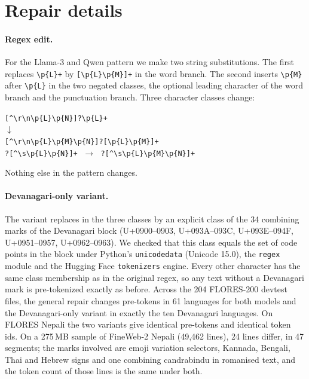 \section{Repair details}
\label{app:regex}

\paragraph{Regex edit.} For the Llama-3 and Qwen pattern we make two string substitutions. The first replaces \texttt{\textbackslash p\{L\}+} by \texttt{[\textbackslash p\{L\}\textbackslash p\{M\}]+} in the word branch. The second inserts \texttt{\textbackslash p\{M\}} after \texttt{\textbackslash p\{L\}} in the two negated classes, the optional leading character of the word branch and the punctuation branch. Three character classes change:
\begin{center}\small
\texttt{[\textasciicircum\textbackslash r\textbackslash n\textbackslash p\{L\}\textbackslash p\{N\}]?\textbackslash p\{L\}+}\\
$\downarrow$\\
\texttt{[\textasciicircum\textbackslash r\textbackslash n\textbackslash p\{L\}\textbackslash p\{M\}\textbackslash p\{N\}]?[\textbackslash p\{L\}\textbackslash p\{M\}]+}\\[4pt]
\texttt{\textvisiblespace?[\textasciicircum\textbackslash s\textbackslash p\{L\}\textbackslash p\{N\}]+}
$\;\rightarrow\;$
\texttt{\textvisiblespace?[\textasciicircum\textbackslash s\textbackslash p\{L\}\textbackslash p\{M\}\textbackslash p\{N\}]+}
\end{center}
Nothing else in the pattern changes.

\paragraph{Devanagari-only variant.} The variant replaces \pM{} in the three classes by an explicit class of the 34 combining marks of the Devanagari block (U+0900--0903, U+093A--093C, U+093E--094F, U+0951--0957, U+0962--0963). We checked that this class equals the set of \pM{} code points in the block under Python's \texttt{unicodedata} (Unicode 15.0), the \texttt{regex} module and the Hugging Face \texttt{tokenizers} engine. Every other character has the same class membership as in the original regex, so any text without a Devanagari mark is pre-tokenized exactly as before. Across the 204 FLORES-200 devtest files, the general repair changes pre-tokens in 61 languages for both models and the Devanagari-only variant in exactly the ten Devanagari languages. On FLORES Nepali the two variants give identical pre-tokens and identical \RII{} token ids. On a 275\,MB sample of FineWeb-2 Nepali (49{,}462 lines), 24 lines differ, in 47 segments; the marks involved are emoji variation selectors, Kannada, Bengali, Thai and Hebrew signs and one combining candrabindu in romanised text, and the \RII{} token count of those lines is the same under both.

